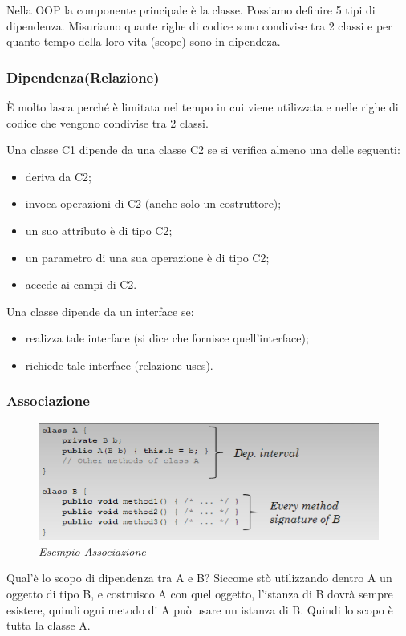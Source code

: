 Nella OOP la componente principale è la classe. Possiamo definire 5 tipi di dipendenza. Misuriamo quante righe di codice sono condivise tra 2 classi e per quanto tempo della loro vita (scope) sono in dipendeza.

\subsubsection{Dipendenza(Relazione)}
È molto lasca perché è limitata nel tempo in cui viene utilizzata e nelle righe di codice che vengono condivise tra 2 classi.

Una classe C1 dipende da una classe C2 se si verifica almeno una delle seguenti:
\begin{itemize}
\item deriva da C2;
\item invoca operazioni di C2 (anche solo un costruttore);
\item un suo attributo è di tipo C2;
\item un parametro di una sua operazione è di tipo C2;
\item accede ai campi di C2.
\end{itemize}

Una classe dipende da un interface se:
\begin{itemize}
\item realizza tale interface (si dice che fornisce quell’interface);
\item richiede tale interface (relazione uses).

\end{itemize}

\subsubsection{Associazione}
\begin{figure}[H]
\includegraphics[scale=0.8]{images/asssociazione}
\caption{\textit{Esempio Associazione} \label{fig:ered5}}
\end{figure}

Qual’è lo scopo di dipendenza tra A e B? Siccome stò utilizzando dentro A un oggetto di tipo B, e costruisco A con quel oggetto, l’istanza di B dovrà sempre esistere, quindi ogni metodo di A può usare un istanza di B. Quindi lo scopo è tutta la classe A.

